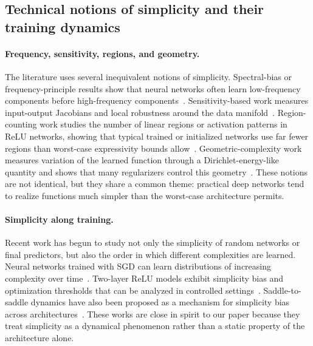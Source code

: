 \documentclass{article}
\begin{document}
\subsection{Technical notions of simplicity and their training dynamics}
\label{app:notions-of-simplicity}

\paragraph{Frequency, sensitivity, regions, and geometry.}
The literature uses several inequivalent notions of simplicity.  Spectral-bias or frequency-principle results show that neural networks often learn low-frequency components before high-frequency components~\citep{rahaman2019spectral}.  Sensitivity-based work measures input-output Jacobians and local robustness around the data manifold~\citep{novak2018sensitivity}.  Region-counting work studies the number of linear regions or activation patterns in ReLU networks, showing that typical trained or initialized networks use far fewer regions than worst-case expressivity bounds allow~\citep{hanin2019complexity,hanin2019activation}.  Geometric-complexity work measures variation of the learned function through a Dirichlet-energy-like quantity and shows that many regularizers control this geometry~\citep{dherin2022geometric}.  These notions are not identical, but they share a common theme: practical deep networks tend to realize functions much simpler than the worst-case architecture permits.

\paragraph{Simplicity along training.}
Recent work has begun to study not only the simplicity of random networks or final predictors, but also the order in which different complexities are learned.  Neural networks trained with SGD can learn distributions of increasing complexity over time~\citep{refinetti2023neural}.  Two-layer ReLU models exhibit simplicity bias and optimization thresholds that can be analyzed in controlled settings~\citep{boursier2024simplicity}.  Saddle-to-saddle dynamics have also been proposed as a mechanism for simplicity bias across architectures~\citep{zhang2026saddle}.  These works are close in spirit to our paper because they treat simplicity as a dynamical phenomenon rather than a static property of the architecture alone.
\end{document}
